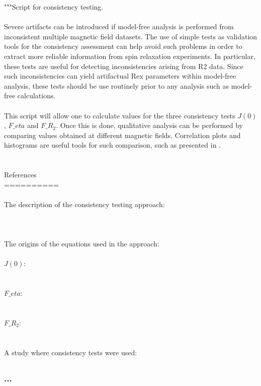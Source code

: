 \begin{exampleenv}
"""Script for consistency testing. \\
 \\
Severe artifacts can be introduced if model-free analysis is performed from inconsistent multiple magnetic field datasets. The use of simple tests as validation tools for the consistency assessment can help avoid such problems in order to extract more reliable information from spin relaxation experiments. In particular, these tests are useful for detecting inconsistencies arising from R2 data. Since such inconsistencies can yield artifactual Rex parameters within model-free analysis, these tests should be use routinely prior to any analysis such as model-free calculations. \\
 \\
This script will allow one to calculate values for the three consistency tests $J(0)$, $F\_eta$ and $F\_{R_2}$. Once this is done, qualitative analysis can be performed by comparing values obtained at different magnetic fields. Correlation plots and histograms are useful tools for such comparison, such as presented in \citet{MorinGagne09a}. \\
 \\
 \\
References \\
========== \\
 \\
The description of the consistency testing approach: \\
 \\
    \citet{MorinGagne09a} \\
 \\
The origins of the equations used in the approach: \\
 \\
    $J(0)$: \\
        \citet{Farrow95} \\
 \\
    $F\_eta$: \\
        \citet{Fushman98} \\
 \\
    $F\_{R_2}$: \\
        \citet{Fushman98} \\
 \\
A study where consistency tests were used: \\
 \\
    \citet{MorinGagne09b}  \\
""" \\

\end{exampleenv}
